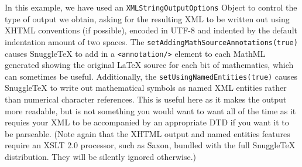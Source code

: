 In this example, we have used an \verb|XMLStringOutputOptions| Object to control the type
of output we obtain, asking for the resulting XML to be written out using XHTML conventions
(if possible), encoded in UTF-8 and indented by the default indentation amount of two spaces.
The \verb|setAddingMathSourceAnnotations(true)| causes SnuggleTeX
to add in a \verb|<annotation/>| element to each MathML generated showing the original
LaTeX source for each bit of mathematics, which can sometimes be useful. Additionally,
the \verb|setUsingNamedEntities(true)| causes SnuggleTeX to write out mathematical symbols
as named XML entities rather than numerical character references. This is useful here as it
makes the output more readable, but is not something you would want to want all of the time
as it requies your XML to be accompanied by an appropriate DTD if you want it to be parseable.
(Note again that the XHTML output and named entities features require an XSLT
2.0 processor, such as Saxon, bundled with the full SnuggleTeX distribution. They will be
silently ignored otherwise.)
